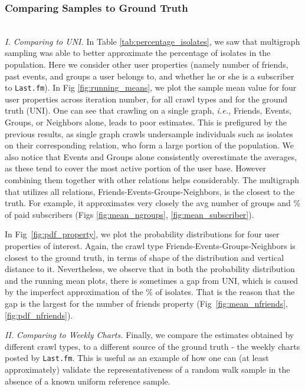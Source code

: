 \documentclass[10pt, conference]{./IEEEtran}
\newcommand{\ie}{{\em i.e., }}
\newcommand{\lastfm}{{\tt Last.fm}\xspace}
\begin{document}
%


\subsubsection{Comparing Samples to Ground Truth}
\label{sec:mg_comparegroundtruth}
~\\
{\em I. Comparing to UNI.}  In Table \ref{tab:percentage_isolates}, we saw that multigraph sampling was able to better approximate the percentage of isolates in the population.
%
 Here we consider other user properties (namely number of friends, past events, and groups a user belongs to, and whether he or she is a subscriber to \lastfm). In Fig \ref{fig:running_means}, we plot the sample mean value for four user properties across iteration number, for all crawl types and for the ground truth (UNI). One can see that crawling on a single graph, \ie Friends, Events, Groups, or Neighbors alone, leads to poor estimates.  This is prefigured by the previous results, as single graph crawls undersample individuals such as isolates on their corresponding relation, who form a large portion of the population. We also notice that Events and Groups alone consistently overestimate the averages, as these tend to cover the most active portion of the user base. However combining them together with other relations helps considerably. The multigraph that utilizes all relations, Friends-Events-Groups-Neighbors, is the closest to the truth. For example, it approximates very closely the avg number of groups and \% of paid subscribers (Figs \ref{fig:mean_ngroups}, \ref{fig:mean_subscriber}).
%

In Fig~\ref{fig:pdf_property}, we plot the probability distributions for four user properties of interest. Again, the crawl type Friends-Events-Groups-Neighbors is closest to the ground truth, in terms of shape of the distribution and vertical distance to it. Nevertheless, we observe that in both the probability distribution and the running mean plots, there is sometimes a gap from UNI, which is caused by the imperfect approximation of the \% of isolates. That is the reason that the gap is the largest for the number of friends property (Fig~\ref{fig:mean_nfriends}, \ref{fig:pdf_nfriends}).

%
%
%
%
%
%
%
%
%
%

%

%
%
%
%
%
%
%
%
%
%
%

{\em II. Comparing to Weekly Charts.} Finally, we compare the estimates obtained by different crawl types, to a different source of the ground truth - the weekly charts posted by \lastfm. This is useful as an example of how one can (at least approximately)
validate the representativeness of a random walk sample in the absence of a known uniform reference sample.
\end{document}
